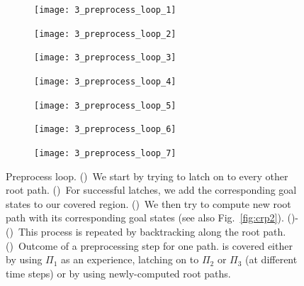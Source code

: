 \documentclass[a4paper,10pt]{article}
\begin{document}
\begin{figure}[t!]
    \centering
    \begin{subfigure}{.45\textwidth}
        \texttt{[image: 3\_preprocess\_loop\_1]}
        \caption{}
        \label{fig:pl1}
    \end{subfigure}
    \hspace{1mm}
    \begin{subfigure}{0.45\textwidth}
        \texttt{[image: 3\_preprocess\_loop\_2]}
        \caption{}
        \label{fig:pl2}
    \end{subfigure} 
    \hspace{1mm}
    \begin{subfigure}{0.45\textwidth}
        \texttt{[image: 3\_preprocess\_loop\_3]}
        \caption{}
        \label{fig:pl3}
    \end{subfigure}
    \hspace{1mm}
    \begin{subfigure}{.45\textwidth}
        \texttt{[image: 3\_preprocess\_loop\_4]}
        \caption{}
        \label{fig:pl4}
    \end{subfigure}
    \begin{subfigure}{0.45\textwidth}
        \texttt{[image: 3\_preprocess\_loop\_5]}
        \caption{}
        \label{fig:pl5}
    \end{subfigure}
    \hspace{1mm}
    \begin{subfigure}{0.45\textwidth}
        \texttt{[image: 3\_preprocess\_loop\_6]}
        \caption{}
        \label{fig:pl6}
    \end{subfigure}
    \hspace{1mm}
    \begin{subfigure}{0.45\textwidth}
        \texttt{[image: 3\_preprocess\_loop\_7]}
        \caption{}
        \label{fig:pl7}
    \end{subfigure}
    \caption{\CaptionTextSize
    Preprocess loop.
    ()~We start by trying to latch on to every other root path. 
    ()~For successful latches, we add the corresponding goal states to our covered region.
    ()~We then try to compute new root path with its corresponding goal states (see also Fig.~\ref{fig:crp2}).
    ()-()~This process is repeated by backtracking along the root path.
    ()~Outcome of a preprocessing step for one path. \Gfull is covered either by using $\Pi_1$ as an experience, 
    latching on to $\Pi_2$ or  $\Pi_3$ (at different time steps)
    or by 
    using newly-computed root paths. 
    }
    \label{fig:pl}
\end{figure}
\end{document}
